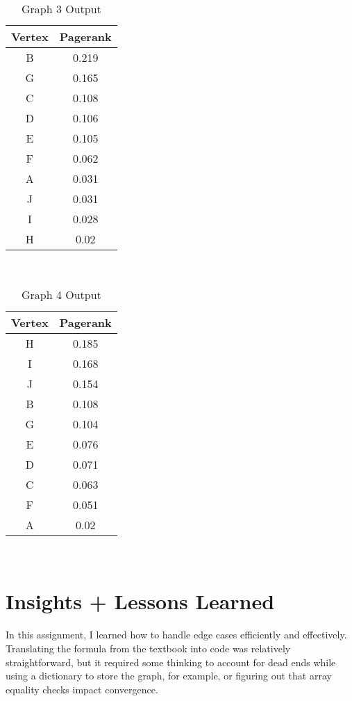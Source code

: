 \documentclass{article}
\begin{document}
\begin{table}[ht!]
    \centering
        \begin{tabular}{| c | c |}
        \hline
        Vertex & Pagerank \\
        \hline
        B & 0.219 \\ 
        \hline
        G & 0.165 \\ 
        \hline
        C & 0.108 \\
        \hline
        D & 0.106 \\
        \hline
        E & 0.105 \\
        \hline
        F & 0.062 \\ 
        \hline
        A & 0.031 \\ 
        \hline
        J & 0.031 \\
        \hline
        I & 0.028 \\
        \hline
        H & 0.02 \\
        \hline
        \end{tabular} \\
        \caption{Graph 3 Output}
\end{table}

\begin{table}[ht!]
    \centering
        \begin{tabular}{| c | c |}
        \hline
        Vertex & Pagerank \\
        \hline
        H & 0.185 \\ 
        \hline
        I & 0.168 \\ 
        \hline
        J & 0.154 \\
        \hline
        B & 0.108 \\
        \hline
        G & 0.104 \\
        \hline
        E & 0.076 \\ 
        \hline
        D & 0.071 \\ 
        \hline
        C & 0.063 \\
        \hline
        F & 0.051 \\
        \hline
        A & 0.02 \\
        \hline
        \end{tabular} \\
        \caption{Graph 4 Output}
\end{table}


\section{Insights + Lessons Learned}
In this assignment, I learned how to handle edge cases efficiently and effectively. Translating the formula from the textbook into code was relatively straightforward, but it required some thinking to account for dead ends while using a dictionary to store the graph, for example, or figuring out that array equality checks impact convergence. 
\end{document}
